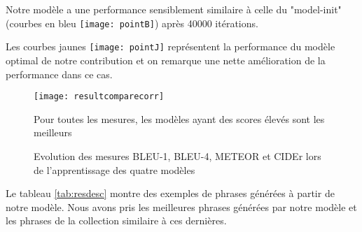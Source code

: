 Notre modèle a une performance sensiblement similaire à celle du 
"model-init"
(courbes en bleu \texttt{[image: pointB]}) après 40000 itérations. 

Les courbes jaunes \texttt{[image: pointJ]} représentent la performance du modèle optimal de notre contribution et on remarque une nette amélioration de la performance dans ce cas.


\begin{figure}[h]
	\begin{center}
		\texttt{[image: resultcomparecorr]}
		\caption{Evolution des mesures BLEU-1, BLEU-4, METEOR et CIDEr lors de l'apprentissage des quatre modèles}	
		\label{fig:rescapt}
	\end{center}
	Pour toutes les mesures, les modèles ayant des scores élevés sont les meilleurs
\end{figure}

Le tableau \ref{tab:resdesc} montre des exemples de phrases générées à partir de notre modèle. Nous avons pris les meilleures phrases générées par notre modèle et les phrases de la collection similaire à ces dernières.

